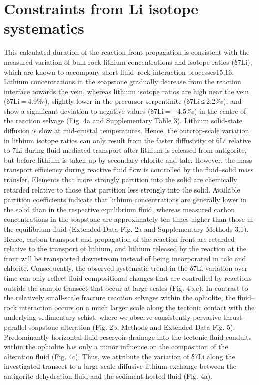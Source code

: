 \section*{Constraints from Li isotope systematics}
This calculated duration of the reaction front propagation is consistent with the measured variation of bulk rock lithium concentrations and isotope ratios (δ7Li), which are known to accompany short fluid–rock interaction processes15,16. Lithium concentrations in the soapstone gradually decrease from the reaction interface towards the vein, whereas lithium isotope ratios are high near the vein (δ7Li = 4.9‰), slightly lower in the precursor serpentinite (δ7Li ≤ 2.2‰), and show a significant deviation to negative values (δ7Li = −4.5‰) in the centre of the reaction selvage (Fig. 4a and Supplementary Table 3). Lithium solid-state diffusion is slow at mid-crustal temperatures. Hence, the outcrop-scale variation in lithium isotope ratios can only result from the faster diffusivity of 6Li relative to 7Li during fluid-mediated transport after lithium is released from antigorite, but before lithium is taken up by secondary chlorite and talc. However, the mass transport efficiency during reactive fluid flow is controlled by the fluid–solid mass transfer. Elements that more strongly partition into the solid are chemically retarded relative to those that partition less strongly into the solid. Available partition coefficients indicate that lithium concentrations are generally lower in the solid than in the respective equilibrium fluid, whereas measured carbon concentrations in the soapstone are approximately ten times higher than those in the equilibrium fluid (Extended Data Fig. 2a and Supplementary Methods 3.1). Hence, carbon transport and propagation of the reaction front are retarded relative to the transport of lithium, and lithium released by the reaction at the front will be transported downstream instead of being incorporated in talc and chlorite. Consequently, the observed systematic trend in the δ7Li variation over time can only reflect fluid compositional changes that are controlled by reactions outside the sample transect that occur at large scales (Fig. 4b,c). In contrast to the relatively small-scale fracture reaction selvages within the ophiolite, the fluid–rock interaction occurs on a much larger scale along the tectonic contact with the underlying sedimentary schist, where we observe consistently pervasive thrust-parallel soapstone alteration (Fig. 2b, Methods and Extended Data Fig. 5). Predominantly horizontal fluid reservoir drainage into the tectonic fluid conduits within the ophiolite has only a minor influence on the composition of the alteration fluid (Fig. 4c). Thus, we attribute the variation of δ7Li along the investigated transect to a large-scale diffusive lithium exchange between the antigorite dehydration fluid and the sediment-hosted fluid (Fig. 4a).


